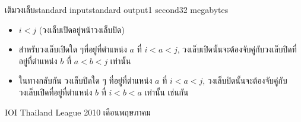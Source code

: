 \documentclass[11pt,a4paper]{article}
\begin{document}
\begin{problem}{เติมวงเล็บ}{standard input}{standard output}{1 second}{32 megabytes}
\begin{itemize}
\item $i < j$   (วงเล็บเปิดอยู่หน้าวงเล็บปิด)
\item สำหรับวงเล็บเปิดใด ๆที่อยู่ที่ตำแหน่ง $a$ ที่ $i < a < j$, วงเล็บเปิดนั้นจะต้องจับคู่กับวงเล็บปิดที่อยู่ที่ตำแหน่ง $b$ ที่ $a < b < j$ เท่านั้น
\item ในทางกลับกัน วงเล็บปิดใด ๆ ที่อยู่ที่ตำแหน่ง $a$ ที่ $i < a < j$, วงเล็บปิดนั้นจะต้องจับคู่กับวงเล็บเปิดที่อยู่ที่ตำแหน่ง $b$ ที่ $i < b < a$ เท่านั้น เช่นกัน
\end{itemize}

\Source

IOI Thailand League 2010 เดือนพฤษภาคม

\end{problem}
\end{document}
